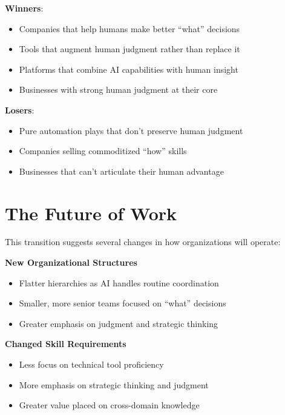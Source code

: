 \documentclass[
  Letterpaper,
]{scrbook}
\providecommand{\tightlist}{%
  \setlength{\itemsep}{0pt}\setlength{\parskip}{0pt}}\usepackage{longtable,booktabs,array}
\begin{document}
\textbf{Winners}:

\begin{itemize}
\tightlist
\item
  Companies that help humans make better ``what'' decisions
\item
  Tools that augment human judgment rather than replace it
\item
  Platforms that combine AI capabilities with human insight
\item
  Businesses with strong human judgment at their core
\end{itemize}

\textbf{Losers}:

\begin{itemize}
\tightlist
\item
  Pure automation plays that don't preserve human judgment
\item
  Companies selling commoditized ``how'' skills
\item
  Businesses that can't articulate their human advantage
\end{itemize}

\section{The Future of Work}\label{the-future-of-work}

This transition suggests several changes in how organizations will
operate:

\textbf{New Organizational Structures}

\begin{itemize}
\tightlist
\item
  Flatter hierarchies as AI handles routine coordination
\item
  Smaller, more senior teams focused on ``what'' decisions
\item
  Greater emphasis on judgment and strategic thinking
\end{itemize}

\textbf{Changed Skill Requirements}

\begin{itemize}
\tightlist
\item
  Less focus on technical tool proficiency
\item
  More emphasis on strategic thinking and judgment
\item
  Greater value placed on cross-domain knowledge
\end{itemize}
\end{document}
